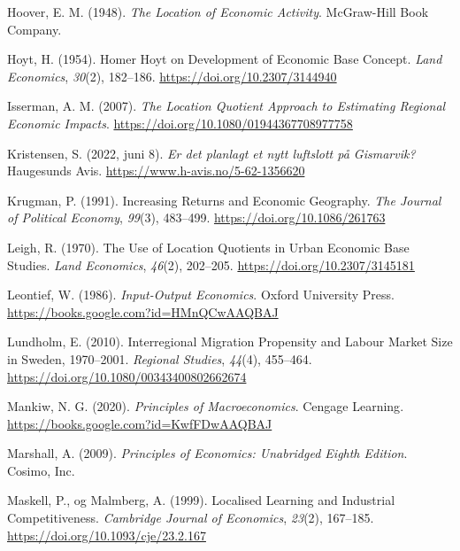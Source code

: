 \documentclass[
]{article}
\newlength{\cslhangindent}
\newlength{\cslentryspacingunit} %
\newenvironment{CSLReferences}[2] %
 {%
  \setlength{\parindent}{0pt}
  \ifodd #1
  \let\oldpar\par
  \def\par{\hangindent=\cslhangindent\oldpar}
  \fi
  \setlength{\parskip}{#2\cslentryspacingunit}
 }%
 {}
\begin{document}
\begin{CSLReferences}{1}{0}
\leavevmode{}%
Hoover, E. M. (1948). \emph{The Location of Economic Activity}.
{McGraw-Hill Book Company}.

\leavevmode{}%
Hoyt, H. (1954). Homer {Hoyt} on {Development} of {Economic Base
Concept}. \emph{Land Economics}, \emph{30}(2), 182--186.
\url{https://doi.org/10.2307/3144940}

\leavevmode{}%
Isserman, A. M. (2007). \emph{The {Location Quotient Approach} to
{Estimating Regional Economic Impacts}}.
\url{https://doi.org/10.1080/01944367708977758}

\leavevmode{}%
Kristensen, S. (2022, juni 8). \emph{Er det planlagt et nytt luftslott
på Gismarvik?} {Haugesunds Avis}.
\url{https://www.h-avis.no/5-62-1356620}

\leavevmode{}%
Krugman, P. (1991). Increasing {Returns} and {Economic Geography}.
\emph{The Journal of Political Economy}, \emph{99}(3), 483--499.
\url{https://doi.org/10.1086/261763}

\leavevmode{}%
Leigh, R. (1970). The {Use} of {Location Quotients} in {Urban Economic
Base Studies}. \emph{Land Economics}, \emph{46}(2), 202--205.
\url{https://doi.org/10.2307/3145181}

\leavevmode{}%
Leontief, W. (1986). \emph{Input-{Output Economics}}. {Oxford University
Press}. \url{https://books.google.com?id=HMnQCwAAQBAJ}

\leavevmode{}%
Lundholm, E. (2010). Interregional {Migration Propensity} and {Labour
Market Size} in {Sweden}, 1970--2001. \emph{Regional Studies},
\emph{44}(4), 455--464. \url{https://doi.org/10.1080/00343400802662674}

\leavevmode{}%
Mankiw, N. G. (2020). \emph{Principles of {Macroeconomics}}. {Cengage
Learning}. \url{https://books.google.com?id=KwfFDwAAQBAJ}

\leavevmode{}%
Marshall, A. (2009). \emph{Principles of {Economics}: {Unabridged Eighth
Edition}}. {Cosimo, Inc.}

\leavevmode{}%
Maskell, P., og Malmberg, A. (1999). Localised Learning and Industrial
Competitiveness. \emph{Cambridge Journal of Economics}, \emph{23}(2),
167--185. \url{https://doi.org/10.1093/cje/23.2.167}


\end{CSLReferences}
\end{document}
